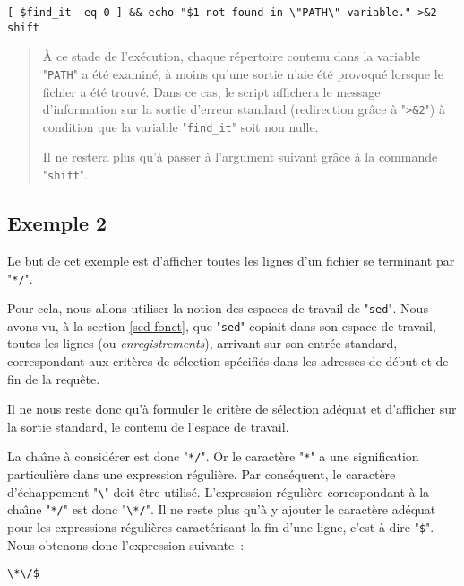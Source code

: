 \begin{verbatim}
[ $find_it -eq 0 ] && echo "$1 not found in \"PATH\" variable." >&2
shift
\end{verbatim}
\begin{quote}
{\`A} ce stade de l'ex{\'e}cution, chaque r{\'e}pertoire contenu dans la variable "{\tt PATH}"
a {\'e}t{\'e} examin{\'e}, {\`a} moins qu'une sortie n'aie {\'e}t{\'e} provoqu{\'e} lorsque le fichier a {\'e}t{\'e} trouv{\'e}.
Dans ce cas, le script affichera le message d'information sur la sortie d'erreur
standard (redirection gr{\^a}ce {\`a} "\verb=>&2=") {\`a} condition que la variable
"\verb=find_it=" soit non nulle.

Il ne restera plus qu'{\`a} passer {\`a} l'argument suivant gr{\^a}ce {\`a} la commande "\verb=shift=".
\end{quote}


\subsection{\label{adv-fltrs-sed-ex2}Exemple 2}

Le but de cet exemple est d'afficher toutes les lignes d'un fichier se terminant par
"\verb=*/=".

Pour cela, nous allons utiliser la notion des espaces de travail de "{\tt sed}".
Nous avons vu, {\`a} la section \ref{sed-fonct}, que "{\tt sed}" copiait dans son
espace de travail, toutes les lignes (ou {\sl enregistrements}), arrivant sur son
entr{\'e}e standard, correspondant aux crit{\`e}res de s{\'e}lection sp{\'e}cifi{\'e}s dans les adresses
de d{\'e}but et de fin de la requ{\^e}te.

Il ne nous reste donc qu'{\`a} formuler le crit{\`e}re de s{\'e}lection ad{\'e}quat et d'afficher sur
la sortie standard, le contenu de l'espace de travail.

La cha{\^\i}ne {\`a} consid{\'e}rer est donc "\verb=*/=". Or le caract{\`e}re "\verb=*=" a une
signification particuli{\`e}re dans une expression r{\'e}guli{\`e}re. Par cons{\'e}quent, le caract{\`e}re
d'{\'e}chappement "\verb=\=" doit {\^e}tre utilis{\'e}. L'expression r{\'e}guli{\`e}re
correspondant {\`a} la cha{\^\i}ne "\verb=*/=" est donc "\verb=\*/=". Il ne reste
plus qu'{\`a} y ajouter le caract{\`e}re ad{\'e}quat pour les expressions r{\'e}guli{\`e}res caract{\'e}risant
la fin d'une ligne, c'est-{\`a}-dire "\verb=$=". Nous obtenons donc l'expression
suivante~:
\begin{center}
\verb=\*\/$=
\end{center}

